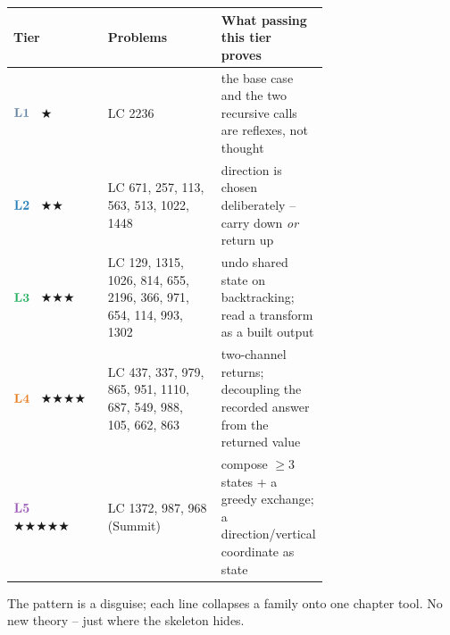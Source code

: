 \begin{center}
\small
\renewcommand{\arraystretch}{1.3}
\begin{tabular}{@{}lp{0.36\linewidth}p{0.34\linewidth}@{}}
\toprule
\textbf{Tier} & \textbf{Problems} & \textbf{What passing this tier proves} \\
\midrule
$\lv1$ \ $\bigstar$
  & LC 2236
  & the base case and the two recursive calls are reflexes, not thought \\
$\lv2$ \ $\bigstar\bigstar$
  & LC 671, 257, 113, 563, 513, 1022, 1448
  & direction is chosen deliberately -- carry down \emph{or} return up \\
$\lv3$ \ $\bigstar\bigstar\bigstar$
  & LC 129, 1315, 1026, 814, 655, 2196, 366, 971, 654, 114, 993, 1302
  & undo shared state on backtracking; read a transform as a built output \\
$\lv4$ \ $\bigstar\bigstar\bigstar\bigstar$
  & LC 437, 337, 979, 865, 951, 1110, 687, 549, 988, 105, 662, 863
  & two-channel returns; decoupling the recorded answer from the returned value \\
$\lv5$ \ $\bigstar\bigstar\bigstar\bigstar\bigstar$
  & LC 1372, 987, 968 (Summit)
  & compose $\ge$3 states + a greedy exchange; a direction/vertical coordinate as state \\
\bottomrule
\end{tabular}
\end{center}


The pattern is a disguise; each line collapses a family onto one chapter tool. No new
theory -- just where the skeleton hides.

